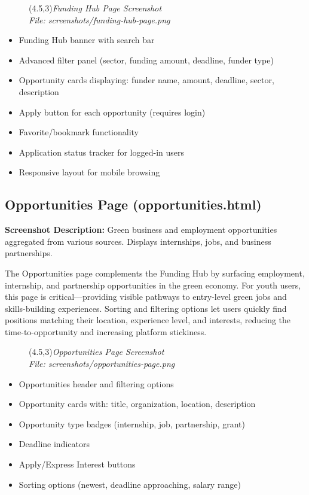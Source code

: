 \documentclass[a4paper,12pt]{article}
\begin{document}
\begin{figure}[h]
    \centering
    \framebox(4.5,3){\textit{Funding Hub Page Screenshot}}\\
    \small\textit{File: screenshots/funding-hub-page.png}
\end{figure}

\begin{itemize}
    \item Funding Hub banner with search bar
    \item Advanced filter panel (sector, funding amount, deadline, funder type)
    \item Opportunity cards displaying: funder name, amount, deadline, sector, description
    \item Apply button for each opportunity (requires login)
    \item Favorite/bookmark functionality
    \item Application status tracker for logged-in users
    \item Responsive layout for mobile browsing
\end{itemize}

\subsection{Opportunities Page (opportunities.html)}
\textbf{Screenshot Description:} Green business and employment opportunities aggregated from various sources. Displays internships, jobs, and business partnerships.

The Opportunities page complements the Funding Hub by surfacing employment, internship, and partnership opportunities in the green economy. For youth users, this page is critical—providing visible pathways to entry-level green jobs and skills-building experiences. Sorting and filtering options let users quickly find positions matching their location, experience level, and interests, reducing the time-to-opportunity and increasing platform stickiness.

\begin{figure}[h]
    \centering
    \framebox(4.5,3){\textit{Opportunities Page Screenshot}}\\
    \small\textit{File: screenshots/opportunities-page.png}
\end{figure}

\begin{itemize}
    \item Opportunities header and filtering options
    \item Opportunity cards with: title, organization, location, description
    \item Opportunity type badges (internship, job, partnership, grant)
    \item Deadline indicators
    \item Apply/Express Interest buttons
    \item Sorting options (newest, deadline approaching, salary range)
\end{itemize}
\end{document}
